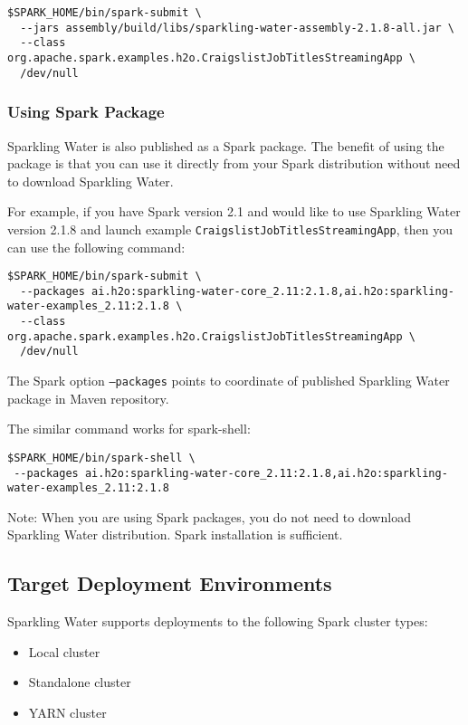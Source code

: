 \pagebreak
\begin{lstlisting}[style=Bash]
$SPARK_HOME/bin/spark-submit \
  --jars assembly/build/libs/sparkling-water-assembly-2.1.8-all.jar \
  --class org.apache.spark.examples.h2o.CraigslistJobTitlesStreamingApp \
  /dev/null
\end{lstlisting}

\subsubsection{Using Spark Package}

Sparkling Water is also published as a Spark package. The benefit of using the package is that you can use it directly from your Spark distribution without need to download Sparkling Water.

For example, if you have Spark version 2.1 and would like to use Sparkling Water version 2.1.8 and launch example \texttt{CraigslistJobTitlesStreamingApp}, then you can use the following command:

\begin{lstlisting}[style=Bash]
$SPARK_HOME/bin/spark-submit \
  --packages ai.h2o:sparkling-water-core_2.11:2.1.8,ai.h2o:sparkling-water-examples_2.11:2.1.8 \
  --class org.apache.spark.examples.h2o.CraigslistJobTitlesStreamingApp \
  /dev/null
\end{lstlisting}

The Spark option \texttt{--packages} points to coordinate of published Sparkling Water package in Maven repository.

The similar command works for spark-shell:

\begin{lstlisting}[style=Bash]
$SPARK_HOME/bin/spark-shell \
 --packages ai.h2o:sparkling-water-core_2.11:2.1.8,ai.h2o:sparkling-water-examples_2.11:2.1.8 
\end{lstlisting}

Note: When you are using Spark packages, you do not need to download Sparkling Water distribution. Spark installation is sufficient.

\newpage
\subsection{Target Deployment Environments}
Sparkling Water supports deployments to the following Spark cluster types:
\begin{itemize}
	\item{Local cluster}
	\item{Standalone cluster} 
	\item{YARN cluster}
\end{itemize}

